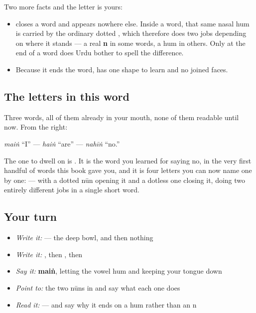 Two more facts and the letter is yours:

\begin{itemize}
\raggedright
  \item \textbf{} closes a word and appears nowhere else. Inside a word, that same nasal hum is carried by the ordinary dotted \textbf{}, which therefore does two jobs depending on where it stands — a real \textbf{n} in some words, a hum in others. Only at the end of a word does Urdu bother to spell the difference.
  \item Because it ends the word, \textbf{} has one shape to learn and no joined faces.
\end{itemize}

\subsection*{The letters in this word}
Three words, all of them already in your mouth, none of them readable until now. From the right:

\begin{quote}
\end{quote}

\begin{quote}
\end{quote}

\begin{quote}
\end{quote}

\emph{maiṅ} \textquotedblleft{}I\textquotedblright{} — \emph{haiṅ} \textquotedblleft{}are\textquotedblright{} — \emph{nahīṅ} \textquotedblleft{}no.\textquotedblright{}

The one to dwell on is \textbf{}. It is the word you learned for saying no, in the very first handful of words this book gave you, and it is four letters you can now name one by one: \textbf{   } — with a dotted nūn opening it and a dotless one closing it, doing two entirely different jobs in a single short word.

\subsection*{Your turn}
\begin{itemize}
\raggedright
  \item \emph{Write it:}  — the deep bowl, and then nothing
  \item \emph{Write it:} , then , then 
  \item \emph{Say it:} \textbf{maiṅ}, letting the vowel hum and keeping your tongue down
  \item \emph{Point to:} the two nūns in  and say what each one does
  \item \emph{Read it:}  — and say why it ends on a hum rather than an n
\end{itemize}


